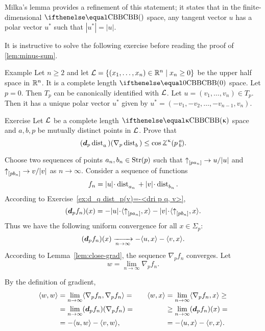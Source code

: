 Milka's lemma provides a refinement of this statement;
it states that in the finite-dimensional $\Alex{}$ space, any tangent vector $u$ has a polar vector $u^*$ such that $|u^*|= |u|$. 

It is instructive to solve the following exercise before reading the proof of \ref{lem:minus-sum}.

\begin{thm}{Example}
Let $n\ge 2$ and let  $\spc{L}=\{(x_1,\ldots, x_n)\in \R^n\mid x_n\ge 0\}$ be the upper half space in $\mathbb{R}^n$. It is a complete length $\Alex{0}$ space.
Let $p=0$. Then $T_p$ can be canonically identified with $ \mathcal{L}$.  Let $u=(v_1,\ldots, v_n)\in T_p$. Then it has a unique polar vector  $u^*$ given by $u^*=(-v_1, -v_2,\ldots, -v_{n-1}, v_n)$.
\end{thm}

\begin{thm}{Exercise}\label{ex:d dist(grad)<0}
Let $\mathcal{L}$ be a complete length $\Alex\kappa$ space and $a,b,p$
be mutually distinct points in $\mathcal{L}$.
Prove that 
\[(\dd_p\distfun{a}{}{})(\nabla_p\distfun{b}{}{})
\le\cos\angk\kappa pab.\]
\end{thm}

Choose two sequences of points $a_n,b_n\in \Str(p)$ such that $\dir{p}{a_n}\to u/|u|$ and $\dir{p}{b_n}\to v/|v|$ as $n\to \infty$.
Consider a sequence of functions 
\[f_n=|u|\cdot\distfun{a_n}{}{}+|v|\cdot\distfun{b_n}{}{}.\]
According to Exercise~\ref{ex:d_q dist_p(v)=-<dri p q, v>}, 
\[(\dd_pf_n)(x)=-|u|\cdot\<\dir{p}{a_n},x\>-|v|\cdot\<\dir{p}{b_n},x\>.\]
Thus we have the following uniform convergence for all $x\in\Sigma_p$:
\[(\dd_pf_n)(x)\xto[n\to\infty]{}-\<u,x\>-\<v,x\>.\]
According to Lemma~\ref{lem:close-grad}, 
the sequence $\nabla_pf_n$ converges.
Let 
\[w=\lim_{n\to\infty}\nabla_pf_n.\]

By the definition of gradient,
\[\begin{aligned}
\<w,w\>&=\lim_{n\to\infty}\<\nabla_pf_n,\nabla_pf_n\>=
&&&%
\<w,x\>&=\lim_{n\to\infty}\<\nabla_pf_n,x\>\ge
\\%
&=\lim_{n\to\infty}(\dd_p f_n)(\nabla_p f_n)
=
&&&%
&\ge
\lim_{n\to\infty}(\dd_pf_n)(x)
=
\\%
&=-\<u,w\>-\<v,w\>,
&&&%
&=-\<u,x\>-\<v,x\>.
\end{aligned}\]
\qedsf












